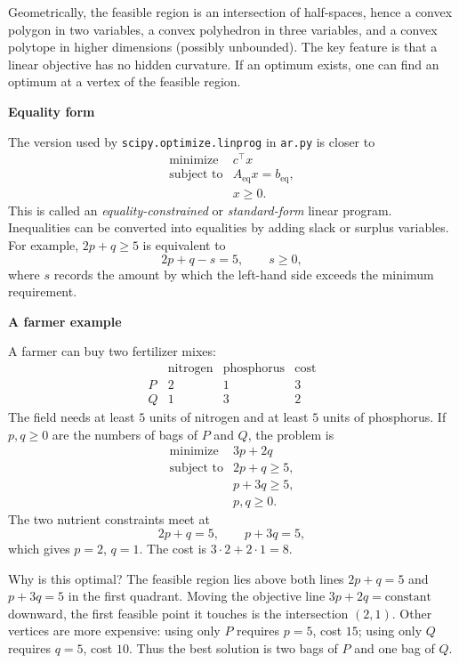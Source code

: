 \documentclass[reqno]{amsart}
\newcommand{\examplepart}[1]{%
    \par\medskip
    \noindent\textbf{\color{agblue}#1}\par\smallskip\noindent
}
\DeclareMathOperator{\1}{\textbf{1}}
\begin{document}
Geometrically, the feasible region is an intersection of half-spaces, hence
a convex polygon in two variables, a convex polyhedron in three variables,
and a convex polytope in higher dimensions (possibly unbounded). The key
feature is that a linear objective has no hidden curvature. If an optimum
exists, one can find an optimum at a vertex of the feasible region.

\examplepart{Equality form}
The version used by \verb|scipy.optimize.linprog| in \verb|ar.py| is closer
to
\[
\begin{array}{ll}
\text{minimize}   & c^\top x \\[2mm]
\text{subject to} & A_{\mathrm{eq}}x=b_{\mathrm{eq}},\\
                  & x\geq0.
\end{array}
\]
This is called an \emph{equality-constrained} or \emph{standard-form}
linear program. Inequalities can be converted into equalities by adding
slack or surplus variables. For example, \(2p+q\geq5\) is equivalent to
\[
2p+q-s=5,\qquad s\geq0,
\]
where \(s\) records the amount by which the left-hand side exceeds the
minimum requirement.

\examplepart{A farmer example}
A farmer can buy two fertilizer mixes:
\[
\begin{array}{c|cc|c}
       & \text{nitrogen} & \text{phosphorus} & \text{cost} \\
\hline
P      & 2              & 1                 & 3 \\
Q      & 1              & 3                 & 2
\end{array}
\]
The field needs at least \(5\) units of nitrogen and at least \(5\) units of
phosphorus. If \(p,q\geq0\) are the numbers of bags of \(P\) and \(Q\), the
problem is
\[
\begin{array}{ll}
\text{minimize}   & 3p+2q \\[1mm]
\text{subject to} & 2p+q\geq5,\\
                  & p+3q\geq5,\\
                  & p,q\geq0.
\end{array}
\]
The two nutrient constraints meet at
\[
2p+q=5,\qquad p+3q=5,
\]
which gives \(p=2\), \(q=1\). The cost is \(3\cdot2+2\cdot1=8\).

Why is this optimal? The feasible region lies above both lines
\(2p+q=5\) and \(p+3q=5\) in the first quadrant. Moving the objective line
\(3p+2q=\text{constant}\) downward, the first feasible point it touches is
the intersection \((2,1)\). Other vertices are more expensive: using only
\(P\) requires \(p=5\), cost \(15\); using only \(Q\) requires \(q=5\), cost
\(10\). Thus the best solution is two bags of \(P\) and one bag of \(Q\).
\end{document}
